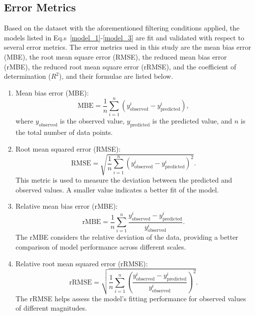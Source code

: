 \documentclass[preprint,12pt]{elsarticle}
\begin{document}
\subsection{Error Metrics}
Based on the dataset with the aforementioned filtering conditions applied, the models listed in Eq.s~\eqref{model_1}-\eqref{model_3} are fit and validated with respect to several error metrics. The error metrics used in this study are the mean bias error (MBE), the root mean square error (RMSE), the reduced mean bias error (rMBE), the reduced root mean square error (rRMSE), and the coefficient of determination ($R^2$), and their formulae are listed below.

\begin{enumerate}
    \item Mean bias error (MBE):
    \begin{equation}
        \mathrm{MBE} = \frac{1}{n} \sum_{i=1}^{n} \left( y_{\mathrm{observed}}^i - y_{\mathrm{predicted}}^i \right),
    \end{equation}
    where $y_{\mathrm{observed}}$ is the observed value, $y_{\mathrm{predicted}}$ is the predicted value, and $n$ is the total number of data points.

    \item Root mean squared error (RMSE):
    \begin{equation}  
        \mathrm{RMSE} = \sqrt{\frac{1}{n} \sum_{i=1}^{n} \left( y_{\mathrm{observed}}^i - y_{\mathrm{predicted}}^i \right)^2}.
    \end{equation}
    This metric is used to measure the deviation between the predicted and observed values. A smaller value indicates a better fit of the model. 

    \item Relative mean bias error (rMBE):
    \begin{equation}
        \mathrm{rMBE} = \frac{1}{n} \sum_{i=1}^{n} \frac{y_{\mathrm{observed}}^i - y_{\mathrm{predicted}}^i}{y_{\mathrm{observed}}^i}.
    \end{equation}
    The rMBE considers the relative deviation of the data, providing a better comparison of model performance across different scales.

    \item Relative root mean squared error (rRMSE):
    \begin{equation}
        \mathrm{rRMSE} = \sqrt{\frac{1}{n} \sum_{i=1}^{n} \left( \frac{y_{\mathrm{observed}}^i - y_{\mathrm{predicted}}^i}{y_{\mathrm{observed}}^i} \right)^2}.
    \end{equation}
    The rRMSE helps assess the model's fitting performance for observed values of different magnitudes.


\end{enumerate}
\end{document}
